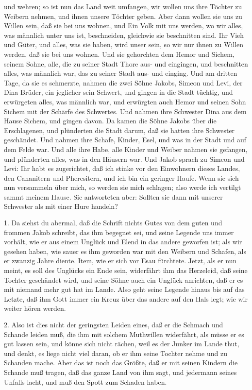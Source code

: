 und wehren; so ist nun das Land weit umfangen, wir wollen uns ihre Töchter zu Weibern nehmen, und ihnen unsere Töchter geben. Aber dann wollen sie uns zu Willen sein, daß sie bei uns wohnen, und Ein Volk mit uns werden, wo wir alles, was männlich unter uns ist, beschneiden, gleichwie sie beschnitten sind. Ihr Vieh und Güter, und alles, was sie haben, wird unser sein, so wir nur ihnen zu Willen werden, daß sie bei uns wohnen. Und sie gehorchten dem Hemor und Sichem, seinem Sohne, alle, die zu seiner Stadt Thore aus- und eingingen, und beschnitten alles, was männlich war, das zu seiner Stadt aus- und einging. Und am dritten Tage, da sie es schmerzte, nahmen die zwei Söhne Jakobs, Simeon und Levi, der Dina Brüder, ein jeglicher sein Schwert, und gingen in die Stadt tüchtig, und erwürgeten alles, was männlich war, und erwürgten auch Hemor und seinen Sohn Sichem mit der Schärfe des Schwertes. Und nahmen ihre Schwester Dina aus dem Hause Sichem, und gingen davon. Da kamen die Söhne Jakobs über die Erschlagenen, und plünderten die Stadt darum, daß sie hatten ihre Schwester geschändet. Und nahmen ihre Schafe, Kinder, Esel, und was in der Stadt und auf dem Felde war. Und alle ihre Habe, alle Kinder und Weiber nahmen sie gefangen, und plünderten alles, was in den Häusern war. Und Jakob sprach zu Simeon und Levi: Ihr habt es zugerichtet, daß ich stinke vor den Einwohnern dieses Landes, den Cananitern und Pheresitern, und ich bin ein geringer Haufe. Wenn sie sich nun versammeln über mich, so werden sie mich schlagen; also werde ich vertilgt sammt meinem Hause. Sie antworteten aber: Sollten sie dann mit unserer Schwester als mit einer Hure handeln?

1. Da siehst du abermal, daß die Schrift nichts Gutes von dem guten und frommen Jakob schreibt, das ihm begegnet sei, und seine Legende uns immer vorhält, wie er aus einem Unglück und Elend in das andere geworfen ist; als wir gesehen haben, wie sauer es ihm geworden war mit den Weibern und Schafen, als er zwanzig Jahre diente. Item, wie er sich vor Esau fürchtete. Jetzt, als er nun meint, es soll des Unglücks ein Ende sein, widerfährt ihm das Herzeleid, daß seine Tochter geschändet wird, und seine Söhne auch ein Unglück anrichten, daß er es mit niemand mehr gut hat im Lande. Also geht seine Legende hinaus bis auf das Letzte, daß ihm Gott immer ein Kreuz über das andere auf den Hals legt; wie wir weiter hören werden.

2. Also ist dies nicht der geringsten Leiden eines, daß er die Schmach und Schande leiden muß, die ihm mit solchem Muthwillen widerfährt, als müsse er es gut lassen sein, und könne sich nicht rächen, weil es der Junker im Lande thut, und denkt, es liege nicht viel daran, ob er ihm seine Tochter nehme und zu Schanden mache. Aber das ist noch das Größte, daß er mit seinen Kindern die Schande muß tragen, daß das ganze Land von ihm sagt, und jedermann seines Unfalls lacht, und muß den Spott zum Schaden haben.

